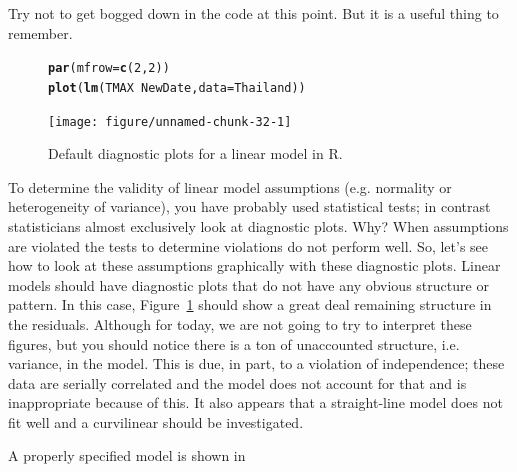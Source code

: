 \documentclass{article}\usepackage[]{graphicx}\usepackage[]{color}
\makeatletter
\newcommand{\hlnum}[1]{\textcolor[rgb]{0.686,0.059,0.569}{#1}}%
\newcommand{\hlopt}[1]{\textcolor[rgb]{0,0,0}{#1}}%
\newcommand{\hlstd}[1]{\textcolor[rgb]{0.345,0.345,0.345}{#1}}%
\newcommand{\hlkwc}[1]{\textcolor[rgb]{0.333,0.667,0.333}{#1}}%
\newcommand{\hlkwd}[1]{\textcolor[rgb]{0.737,0.353,0.396}{\textbf{#1}}}%
\newenvironment{kframe}{%
 \def\at@end@of@kframe{}%
 \ifinner\ifhmode%
  \def\at@end@of@kframe{\end{minipage}}%
  \begin{minipage}{\columnwidth}%
 \fi\fi%
 \def\FrameCommand##1{\hskip\@totalleftmargin \hskip-\fboxsep
 \colorbox{shadecolor}{##1}\hskip-\fboxsep
     \hskip-\linewidth \hskip-\@totalleftmargin \hskip\columnwidth}%
 \MakeFramed {\advance\hsize-\width
   \@totalleftmargin\z@ \linewidth\hsize
   \@setminipage}}%
 {\par\unskip\endMakeFramed%
 \at@end@of@kframe}
\newenvironment{knitrout}{}{} %
\makeatother
\begin{document}
Try not to get bogged down in the code at this point. But it is a useful thing to remember.

\begin{figure}
\label{fig:diagnostics}
\caption{Default diagnostic plots for a linear model in R.}
\begin{knitrout}
\color{fgcolor}\begin{kframe}
\begin{alltt}
\hlkwd{par}\hlstd{(}\hlkwc{mfrow}\hlstd{=}\hlkwd{c}\hlstd{(}\hlnum{2}\hlstd{,}\hlnum{2}\hlstd{))}
\hlkwd{plot}\hlstd{(}\hlkwd{lm}\hlstd{(TMAX} \hlopt{~} \hlstd{NewDate,} \hlkwc{data}\hlstd{=Thailand))}
\end{alltt}
\end{kframe}
\texttt{[image: figure/unnamed-chunk-32-1]} 

\end{knitrout}
\end{figure}

To determine the validity of linear model assumptions (e.g. normality or heterogeneity of variance), you have probably used statistical tests; in contrast statisticians almost exclusively look at diagnostic plots. Why?  When assumptions are violated the tests to determine violations do not perform well. So, let's see how to look at these assumptions graphically with these diagnostic plots. Linear models should have diagnostic plots that do not have any obvious structure or pattern. In this case, Figure~\ref{fig:diagnostics} should show a great deal remaining structure in the residuals. Although for today, we are not going to try to interpret these figures, but you should notice there is a ton of unaccounted structure, i.e. variance, in the model. This is due, in part, to a violation of independence; these data are serially correlated and the model does not account for that and is inappropriate because of this. It also appears that a straight-line model does not fit well and a curvilinear should be investigated.

A properly specified model is shown in 

\end{document}
